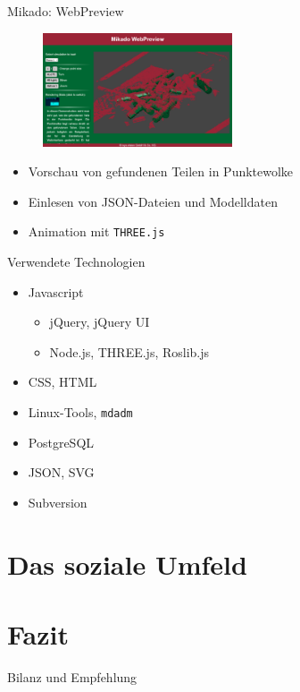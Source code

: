 \documentclass[xcolor=dvipsnames]{beamer}
\begin{document}
\begin{frame}{Mikado: WebPreview}
\begin{figure}[t]
\includegraphics[width=0.5\textwidth]{media/webpreview.png}
\end{figure}
\begin{itemize}
\item Vorschau von gefundenen Teilen in Punktewolke
\item Einlesen von JSON-Dateien und Modelldaten
\item Animation mit \texttt{THREE.js}
\end{itemize}
\end{frame}

\begin{frame}{Verwendete Technologien}
\begin{itemize}
\item Javascript
\begin{itemize}
\item jQuery, jQuery UI
\item Node.js, THREE.js, Roslib.js
\end{itemize}
\item CSS, HTML
\item Linux-Tools, \texttt{mdadm}
\item PostgreSQL
\item JSON, SVG
\item Subversion
\end{itemize}
\end{frame}


\section{Das soziale Umfeld}

\begin{frame}
\end{frame}


\section{Fazit}

\begin{frame}{Bilanz und Empfehlung}
\end{frame}


\end{document}
